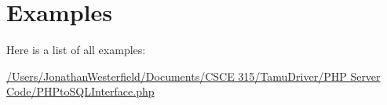 \section{Examples}
Here is a list of all examples\+:\begin{DoxyCompactItemize}
\item 
\hyperlink{_2_users_2_jonathan_westerfield_2_documents_2_c_s_c_e_01315_2_tamu_driver_2_p_h_p_01_server_01_c4278c66461d45e51df78d3895915b789}{/\+Users/\+Jonathan\+Westerfield/\+Documents/\+C\+S\+C\+E 315/\+Tamu\+Driver/\+P\+H\+P Server Code/\+P\+H\+Pto\+S\+Q\+L\+Interface.\+php}
\end{DoxyCompactItemize}

